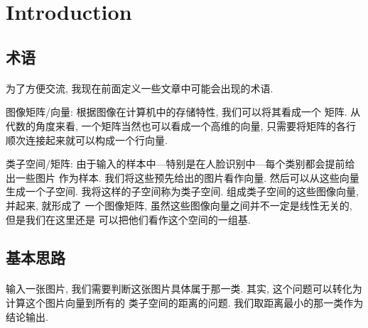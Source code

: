 \documentclass[fleqn,10pt]{SelfArx} %
\affiliation{\textsuperscript{1}\textit{电子科技大学, 计算机科学与工程学院}} %
\affiliation{*\textbf{联系方式 : x312035@gmail.com}} %
\begin{document}
\flushbottom %

\maketitle %

\tableofcontents %

\thispagestyle{empty} %


\section*{Introduction} %
\subsection*{术语}
	\paragraph{}
		为了方便交流, 我现在前面定义一些文章中可能会出现的术语.

		图像矩阵/向量: 根据图像在计算机中的存储特性, 我们可以将其看成一个
		矩阵. 从代数的角度来看, 一个矩阵当然也可以看成一个高维的向量,
		只需要将矩阵的各行顺次连接起来就可以构成一个行向量.

		类子空间/矩阵: 由于输入的样本中---特别是在人脸识别中---每个类别都会提前给出一些图片
		作为样本. 我们将这些预先给出的图片看作向量. 然后可以从这些向量生成一个子空间.
		我将这样的子空间称为类子空间. 组成类子空间的这些图像向量, 并起来, 就形成了
		一个图像矩阵, 虽然这些图像向量之间并不一定是线性无关的, 但是我们在这里还是
		可以把他们看作这个空间的一组基.

\subsection*{基本思路}
	\paragraph{}
		输入一张图片, 我们需要判断这张图片具体属于那一类. 
		其实, 这个问题可以转化为计算这个图片向量到所有的
		类子空间的距离的问题. 我们取距离最小的那一类作为结论输出.
\end{document}
